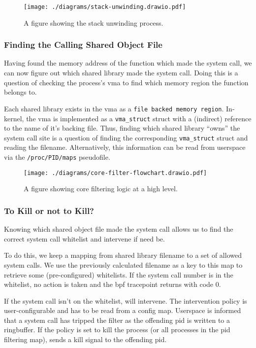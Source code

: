\begin{figure}[ht]
    \centering
    \texttt{[image: ./diagrams/stack-unwinding.drawio.pdf]} 
    \caption{A figure showing the stack unwinding process.}
    \label{fig:stack-unwinding}
\end{figure}

\subsubsection{Finding the Calling Shared Object File}\label{subsubsec:find_so}

Having found the memory address of the function which made the system call, we
can now figure out which shared library made the system call. Doing this is a
question of checking the process's \ac{vma} to find which memory region the
function belongs to. 

Each shared library exists in the \ac{vma} as a \texttt{file backed memory region}.
In-kernel, the \ac{vma} is implemented as a \texttt{vma\_struct} struct with a
(indirect) reference to the name of it's backing file. Thus, finding which
shared library ``owns'' the system call site is a question of finding the
corresponding \texttt{vma\_struct} struct and reading the filename.
Alternatively, this information can be read from userspace via the
\texttt{/proc/PID/maps} pseudofile.

\begin{figure}[h]
    \centering
    \texttt{[image: ./diagrams/core-filter-flowchart.drawio.pdf]}
    \caption{A figure showing \afg core filtering logic at a high level.}
    \label{fig:core-filter-flowchart}
\end{figure}

\subsubsection{To Kill or not to Kill?}

Knowing which shared object file made the system call allows us to find the correct
system call whitelist and intervene if need be.

To do this, we keep a mapping from shared library filename to a set of allowed
system calls. We use the previously calculated filename as a key to this map to
retrieve some (pre-configured) whitelists. If the system call number is in the
whitelist, no action is taken and the \ac{bpf} tracepoint returns with code 0.

If the system call isn't on the whitelist, \af will intervene. The intervention
policy is user-configurable and has to be read from a config map. Userspace is
informed that a system call has tripped the filter as the offending \ac{pid} is
written to a ringbuffer. If the policy is set to kill the process (or all 
processes in the \ac{pid} filtering map), \af sends a kill signal to the 
offending \ac{pid}. 

